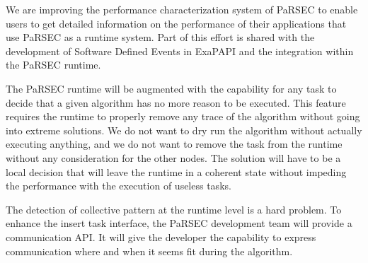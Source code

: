We are improving the performance characterization system of PaRSEC to
enable users to get detailed information on the performance of their
applications that use PaRSEC as a runtime system. Part of this effort
is shared with the development of Software Defined Events in ExaPAPI
and the integration within the PaRSEC runtime.

The PaRSEC runtime will be augmented with the capability for any task
to decide that a given algorithm has no more reason to be
executed. This feature requires the runtime to properly remove any
trace of the algorithm without going into extreme solutions. We do not
want to dry run the algorithm without actually executing anything, and
we do not want to remove the task from the runtime without any
consideration for the other nodes. The solution will have to be a
local decision that will leave the runtime in a coherent state without
impeding the performance with the execution of useless tasks.


The detection of collective pattern at the runtime level is a hard
problem.  To enhance the insert task interface, the PaRSEC development
team will provide a communication API. It will give the developer the
capability to express communication where and when it seems fit during
the algorithm.